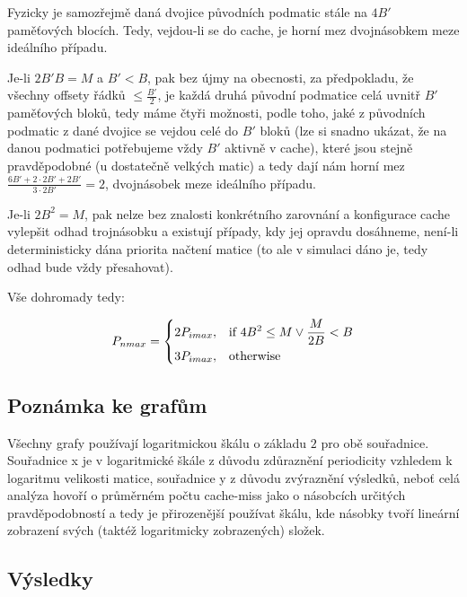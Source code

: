\documentclass[a4paper,12pt]{article} %
\begin{document}
Fyzicky je samozřejmě daná dvojice původních podmatic stále na $4B'$ paměťových blocích. Tedy, vejdou-li se do cache, je horní mez dvojnásobkem meze ideálního případu.

Je-li $2 B' B = M$ a $B' < B$, pak bez újmy na obecnosti, za předpokladu, že všechny offsety řádků $\leq\frac{B'}{2}$, je každá druhá původní podmatice celá uvnitř $B'$ paměťových bloků, tedy máme čtyři možnosti, podle toho, jaké z původních podmatic z dané dvojice se vejdou celé do $B'$ bloků (lze si snadno ukázat, že na danou podmatici potřebujeme vždy $B'$ aktivně v cache), které jsou stejně pravděpodobné (u dostatečně velkých matic) a tedy dají nám horní mez $\frac{6B' + 2 \cdot 2 B' + 2 B'}{3 \cdot 2B'} = 2$, dvojnásobek meze ideálního případu.

Je-li $2 B^2 = M$, pak nelze bez znalosti konkrétního zarovnání a konfigurace cache vylepšit odhad trojnásobku a existují případy, kdy jej opravdu dosáhneme, není-li deterministicky dána priorita načtení matice (to ale v simulaci dáno je, tedy odhad bude vždy přesahovat).

Vše dohromady tedy:

\[
	P_{nmax} = \begin{dcases}
		2 P_{imax}, & \text{if } 4B^2 \leq M \vee \frac{M}{2B} < B\\
		3 P_{imax}, & \text{otherwise}
	\end{dcases}
\]

\subsection{Poznámka ke grafům}

Všechny grafy používají logaritmickou škálu o základu $2$ pro obě souřadnice. Souřadnice x je v logaritmické škále z důvodu zdůraznění periodicity vzhledem k logaritmu velikosti matice, souřadnice y z důvodu zvýraznění výsledků, neboť celá analýza hovoří o průměrném počtu cache-miss jako o násobcích určitých pravděpodobností a tedy je přirozenější používat škálu, kde násobky tvoří lineární zobrazení svých (taktéž logaritmicky zobrazených) složek.

\pagebreak

\subsection{Výsledky}
\label{results}
\end{document}
